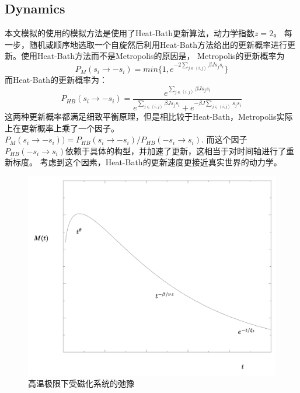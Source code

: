 \documentclass[a4paper]{article}
\begin{document}
\subsection{Dynamics}
本文模拟的使用的模拟方法是使用了Heat-Bath更新算法，动力学指数$z=2$。
每一步，随机或顺序地选取一个自旋然后利用Heat-Bath方法给出的更新概率进行更新。使用Heat-Bath方法而不是Metropolis的原因是，
Metropolis的更新概率为
$$P_M(s_i\rightarrow -s_i)=min\{1,e^{-2\sum_{j \in \left\langle i,j \right\rangle}\beta Js_js_i}\}$$
而Heat-Bath的更新概率为：
$$P_{HB}(s_i\rightarrow -s_i)=\frac{e^{\sum_{j \in \left\langle i,j \right\rangle}\beta Js_js_i}}{e^{\sum_{j \in \left\langle i,j \right\rangle}\beta Js_js_i}+e^{-\beta J\sum_{j \in \left\langle i,j \right\rangle}s_js_i}}$$
这两种更新概率都满足细致平衡原理，但是相比较于Heat-Bath，Metropolis实际上在更新概率上乘了一个因子。$P_M(s_i\rightarrow -s_i))=P_{HB}(s_i\rightarrow -s_i)/P_{HB}(-s_i\rightarrow s_i)$. 
而这个因子 $P_{HB}(-s_i\rightarrow s_i)$依赖于具体的构型，并加速了更新，这相当于对时间轴进行了重新标度。
考虑到这个因素，Heat-Bath的更新速度更接近真实世界的动力学。
\begin{figure}[h]
    \centering
    \includegraphics[width=16.0cm]{../figure/sketch.png}
    \caption{高温极限下受磁化系统的弛豫}
\end{figure}
\end{document}
